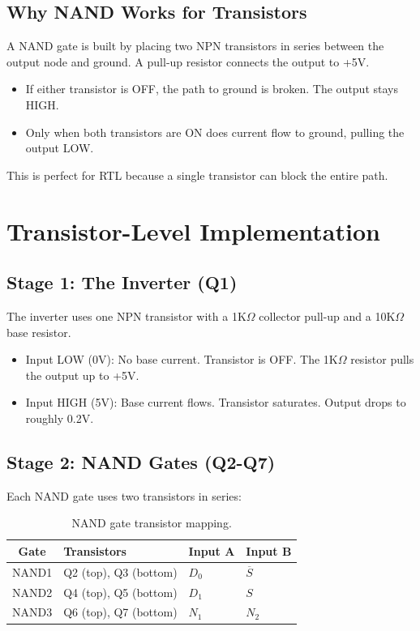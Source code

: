 \documentclass[11pt,a4paper]{article}
\begin{document}
\subsection{Why NAND Works for Transistors}

A NAND gate is built by placing two NPN transistors in series between the output node and ground. A pull-up resistor connects the output to +5V.

\begin{itemize}[leftmargin=2em]
  \item If either transistor is OFF, the path to ground is broken. The output stays HIGH.
  \item Only when both transistors are ON does current flow to ground, pulling the output LOW.
\end{itemize}

This is perfect for RTL because a single transistor can block the entire path.

\section{Transistor-Level Implementation}

\subsection{Stage 1: The Inverter (Q1)}

The inverter uses one NPN transistor with a 1K$\Omega$ collector pull-up and a 10K$\Omega$ base resistor.

\begin{itemize}[leftmargin=2em]
  \item Input LOW (0V): No base current. Transistor is OFF. The 1K$\Omega$ resistor pulls the output up to +5V.
  \item Input HIGH (5V): Base current flows. Transistor saturates. Output drops to roughly 0.2V.
\end{itemize}

\subsection{Stage 2: NAND Gates (Q2-Q7)}

Each NAND gate uses two transistors in series:

\begin{table}[H]
\centering
\caption{NAND gate transistor mapping.}
\begin{tabular}{@{}clll@{}}
\toprule
\textbf{Gate} & \textbf{Transistors} & \textbf{Input A} & \textbf{Input B} \\
\midrule
NAND1 & Q2 (top), Q3 (bottom) & $D_0$ & $\overline{S}$ \\
NAND2 & Q4 (top), Q5 (bottom) & $D_1$ & $S$ \\
NAND3 & Q6 (top), Q7 (bottom) & $N_1$ & $N_2$ \\
\bottomrule
\end{tabular}
\end{table}
\end{document}

